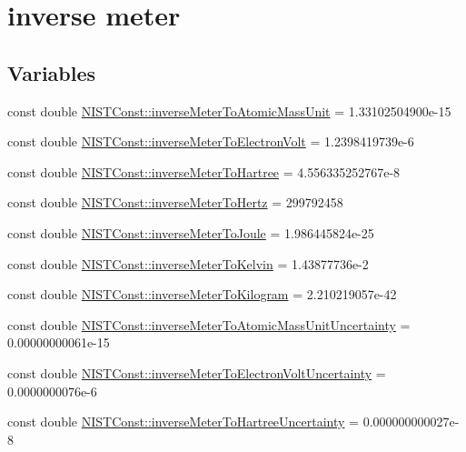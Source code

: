 \hypertarget{group___inverse_meter}{}\section{inverse meter}
\label{group___inverse_meter}
\subsection*{Variables}
\begin{DoxyCompactItemize}
\item 
const double \hyperlink{group___inverse_meter_ga7d76b1c26bd9b6226d0bdbcbfe44c3a0}{N\+I\+S\+T\+Const\+::inverse\+Meter\+To\+Atomic\+Mass\+Unit} = 1.\+33102504900e-\/15
\item 
const double \hyperlink{group___inverse_meter_gafdede27a7699d3a180bb829b65fac447}{N\+I\+S\+T\+Const\+::inverse\+Meter\+To\+Electron\+Volt} = 1.\+2398419739e-\/6
\item 
const double \hyperlink{group___inverse_meter_ga6f47bdfe8997031b0f15229eb5bf4b9e}{N\+I\+S\+T\+Const\+::inverse\+Meter\+To\+Hartree} = 4.\+556335252767e-\/8
\item 
const double \hyperlink{group___inverse_meter_ga5743c27316774c4f065336d0a016508e}{N\+I\+S\+T\+Const\+::inverse\+Meter\+To\+Hertz} = 299792458
\item 
const double \hyperlink{group___inverse_meter_gaa927232a822dccc33f7c56ac002aff52}{N\+I\+S\+T\+Const\+::inverse\+Meter\+To\+Joule} = 1.\+986445824e-\/25
\item 
const double \hyperlink{group___inverse_meter_gaf5a61f53f6757db329df597b76b2df69}{N\+I\+S\+T\+Const\+::inverse\+Meter\+To\+Kelvin} = 1.\+43877736e-\/2
\item 
const double \hyperlink{group___inverse_meter_ga6b5807b2161fa29684e4862e575b9102}{N\+I\+S\+T\+Const\+::inverse\+Meter\+To\+Kilogram} = 2.\+210219057e-\/42
\item 
const double \hyperlink{group___inverse_meter_ga19f65e8c675ab4bbf77f2d7fcc27dec8}{N\+I\+S\+T\+Const\+::inverse\+Meter\+To\+Atomic\+Mass\+Unit\+Uncertainty} = 0.\+00000000061e-\/15
\item 
const double \hyperlink{group___inverse_meter_gaffb7462545a03fb13544c9f65d77dc7e}{N\+I\+S\+T\+Const\+::inverse\+Meter\+To\+Electron\+Volt\+Uncertainty} = 0.\+0000000076e-\/6
\item 
const double \hyperlink{group___inverse_meter_gac31d4508dcf24c9b18d914aa6f8760a1}{N\+I\+S\+T\+Const\+::inverse\+Meter\+To\+Hartree\+Uncertainty} = 0.\+000000000027e-\/8

\end{DoxyCompactItemize}
